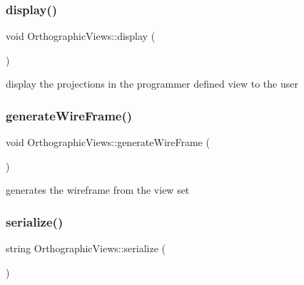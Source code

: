 \mbox{\label{class_orthographic_views_a9e5f48f91dd92b22ce9418663cdbf8f8}} 
\subsubsection{\texorpdfstring{display()}{display()}}
{\footnotesize\ttfamily void Orthographic\+Views\+::display (\begin{DoxyParamCaption}{ }\end{DoxyParamCaption})}



display the projections in the programmer defined view to the user 

\mbox{\label{class_orthographic_views_ab169cb6a89b9575d7814a683240567ac}} 
\subsubsection{\texorpdfstring{generate\+Wire\+Frame()}{generateWireFrame()}}
{\footnotesize\ttfamily void Orthographic\+Views\+::generate\+Wire\+Frame (\begin{DoxyParamCaption}{ }\end{DoxyParamCaption})}



generates the wireframe from the view set 

\mbox{\label{class_orthographic_views_a207741d30f67bf0da1356c10cc819731}} 
\subsubsection{\texorpdfstring{serialize()}{serialize()}}
{\footnotesize\ttfamily string Orthographic\+Views\+::serialize (\begin{DoxyParamCaption}{ }\end{DoxyParamCaption})}



